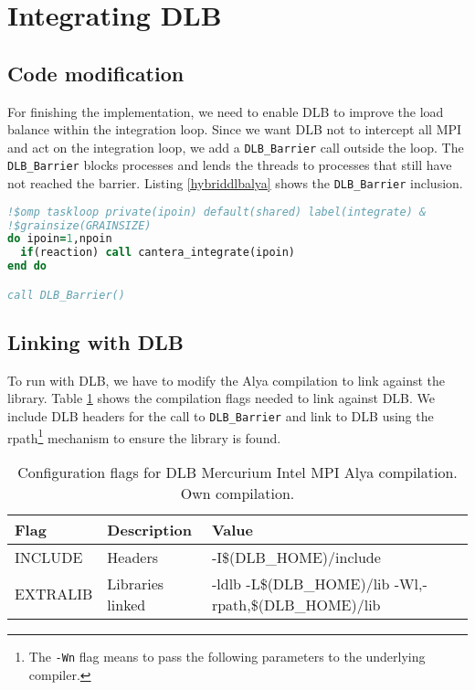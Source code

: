 \section{Integrating DLB}

\subsection{Code modification}
For finishing the implementation, we need to enable DLB to improve the load balance within the integration loop. Since we want DLB not to intercept all MPI and act on the integration loop, we add a \texttt{DLB\_Barrier} call outside the loop. The \texttt{DLB\_Barrier} blocks processes and lends the threads to processes that still have not reached the barrier. Listing \ref{hybriddlbalya} shows the \texttt{DLB\_Barrier} inclusion.

\begin{lstlisting}[language=Fortran, caption={Chemical integration hybrid DLB loop.}, label={hybriddlbalya}]
!$omp taskloop private(ipoin) default(shared) label(integrate) &
!$grainsize(GRAINSIZE)
do ipoin=1,npoin
  if(reaction) call cantera_integrate(ipoin)
end do

call DLB_Barrier()
\end{lstlisting}

\subsection{Linking with DLB}

To run with DLB, we have to modify the Alya compilation to link against the library. Table \ref{flagsompssdlb} shows the compilation flags needed to link against DLB. We include DLB headers for the call to \texttt{DLB\_Barrier} and link to DLB using the rpath\footnote{The \texttt{-Wn} flag means to pass the following parameters to the underlying compiler. } mechanism to ensure the library is found.

\begin{table}[htbp]
\centering
\begin{tabular}{l|l|l} 
\toprule
\textbf{Flag}     & \textbf{Description}         & \textbf{Value}                                                                       \\ 
\hline
INCLUDE      & Headers &  -I\$(DLB\_HOME)/include                                                                      \\ 
\hline
EXTRALIB      & Libraries linked &  -ldlb -L\$(DLB\_HOME)/lib -Wl,-rpath,\$(DLB\_HOME)/lib                                                                    \\ 
\bottomrule
\end{tabular}
\caption[Configuration flags for DLB Mercurium Intel MPI Alya compilation.]{Configuration flags for DLB Mercurium Intel MPI Alya compilation. Own compilation.}
\label{flagsompssdlb}
\end{table}


